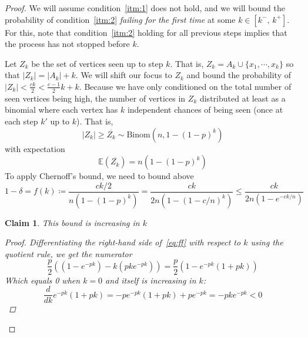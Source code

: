 \documentclass{amsart}
\theoremstyle{plain}
\newtheorem*{claim}{\textbf{Claim}}
\theoremstyle{definition}
\begin{document}
    \begin{proof}
        \vspace{-3mm}
        We will assume condition~\eqref{itm:1} does not hold, and we will bound the probability of
        condition~\eqref{itm:2} \emph{failing for the first time} at some $k \in [k^{-}, \, k^{+}]$.
        For this, note that condition~\eqref{itm:2} holding for all previous steps implies that
        the process has not stopped before $k$.

        \noindent Let $Z_k$ be the set of vertices seen up to step $k$.
        That is, $Z_k = A_k \cup \{x_1, \cdots, x_k\}$ so that $|Z_k| = |A_k| + k$.
        We will shift our focus to $Z_k$ and bound the probability of $|Z_k| < \frac{ck}{2} < \frac{c-1}{2}k + k$.
        Because we have only conditioned on the total number of seen vertices being high,
        the number of vertices in $Z_k$ distributed at least as a binomial
        where each vertex has $k$ independent chances of being seen (once at each step $k'$ up to $k$).
        That is,
        \begin{equation}
            |Z_k| \geq \overline{Z_k} \sim \text{Binom}\left(n, 1 - (1 - p)^k\right)
            \label{eq:binom}
        \end{equation}
        with expectation
        \begin{equation}
            \mathbb{E}\left(\overline{Z_k}\right) = n\left(1 - (1 - p)^k\right)
            \label{eq:expec}
        \end{equation}
    To apply Chernoff's bound, we need to bound above
    \begin{equation}
        1 - \delta = f(k) \coloneqq \frac{ck/2}{n\left(1 - (1 - p)^k\right)} =
        \frac{ck}{2n\left(1 - (1 - c/n)^k\right)} \leq \frac{ck}{2n\left(1 - e^{-ck/n}\right)}
        \label{eq:ff}
    \end{equation}
    \begin{claim}
        This bound is increasing in $k$ %

        \begin{proof}
            Differentiating the right-hand side of~\eqref{eq:ff} with respect to $k$ using the quotient rule, we get
            the numerator
            \begin{equation}
                \frac{p}{2}\left(\left(1 - e^{-pk}\right) - k\left(pke^{-pk}\right)\right) = \frac{p}{2}\left(1 - e^{-pk}\left(1 + pk\right)\right)
                \label{eq:diff_num}
            \end{equation}
            Which equals 0 when $k=0$ and itself is increasing in $k$:
            \begin{equation}
                \frac{d}{dk}e^{-pk}\left(1 + pk\right) = -p e^{-pk} \left(1 + pk\right) + p e^{-pk} = -pk e^{-pk} < 0
                \label{eq:diff_num2}
            \end{equation}
        \end{proof}
        

\end{claim}
\end{proof}
\end{document}
